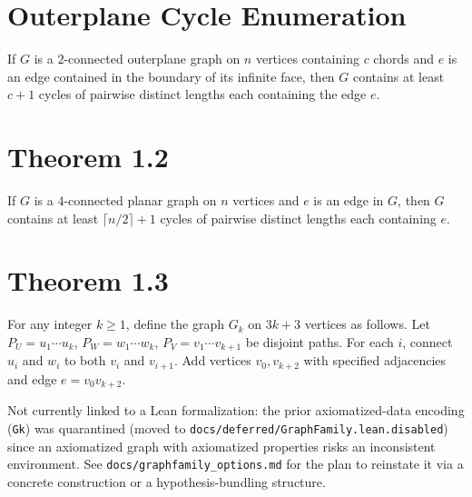 \section{Outerplane Cycle Enumeration}

\begin{lemma}
  \label{lem:outerplane_cycles}
  \notready
  If $G$ is a $2$-connected outerplane graph on $n$ vertices containing $c$
  chords and $e$ is an edge contained in the boundary of its infinite face,
  then $G$ contains at least $c + 1$ cycles of pairwise distinct lengths
  each containing the edge $e$.
\end{lemma}

\section{Theorem 1.2}

\begin{theorem}[Theorem 1.2]
  \label{thm:main_lower_bound}
  \notready
  If $G$ is a $4$-connected planar graph on $n$ vertices and $e$ is an edge
  in $G$, then $G$ contains at least $\lceil n/2 \rceil + 1$ cycles of
  pairwise distinct lengths each containing $e$.
\end{theorem}

\section{Theorem 1.3}

\begin{definition}
  \label{def:gk_construction}
  \notready
  For any integer $k \ge 1$, define the graph $G_k$ on $3k+3$ vertices as
  follows. Let $P_U = u_1 \cdots u_k$, $P_W = w_1 \cdots w_k$,
  $P_V = v_1 \cdots v_{k+1}$ be disjoint paths. For each $i$, connect
  $u_i$ and $w_i$ to both $v_i$ and $v_{i+1}$. Add vertices $v_0, v_{k+2}$
  with specified adjacencies and edge $e = v_0 v_{k+2}$.

  Not currently linked to a Lean formalization: the prior axiomatized-data
  encoding (\texttt{Gk}) was quarantined (moved to
  \texttt{docs/deferred/GraphFamily.lean.disabled}) since an axiomatized
  graph with axiomatized properties risks an inconsistent environment. See
  \texttt{docs/graphfamily\_options.md} for the plan to reinstate it via a
  concrete construction or a hypothesis-bundling structure.
\end{definition}

